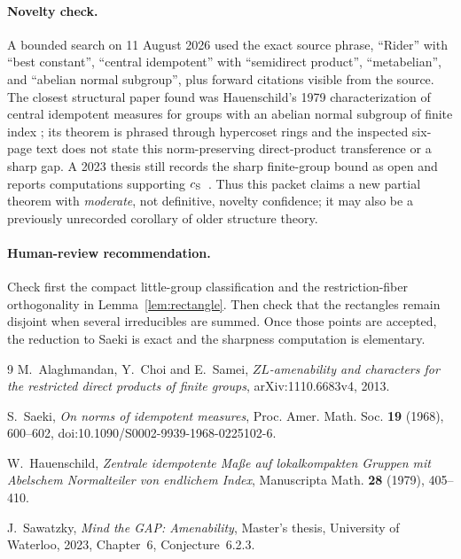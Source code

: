 \documentclass[11pt]{article}
\newcommand{\1}{\mathbf 1}
\begin{document}
\paragraph{Novelty check.}
A bounded search on 11 August 2026 used the exact source phrase, ``Rider'' with
``best constant'', ``central idempotent'' with ``semidirect product'', ``metabelian'',
and ``abelian normal subgroup'', plus forward citations visible from the source.
The closest structural paper found was Hauenschild's 1979 characterization of central
idempotent measures for groups with an abelian normal subgroup of finite index
\cite{Hauenschild}; its theorem is phrased through hypercoset rings and the inspected
six-page text does not state this norm-preserving direct-product transference or a sharp
gap.  A 2023 thesis still records the sharp finite-group bound as open and reports
computations supporting $c_{\rm S}$~\cite{Sawatzky}.  Thus this packet claims a new
partial theorem with \emph{moderate}, not definitive, novelty confidence; it may also
be a previously unrecorded corollary of older structure theory.

\paragraph{Human-review recommendation.}
Check first the compact little-group classification and the restriction-fiber
orthogonality in Lemma~\ref{lem:rectangle}.  Then check that the rectangles remain
disjoint when several irreducibles are summed.  Once those points are accepted, the
reduction to Saeki is exact and the sharpness computation is elementary.

\begin{thebibliography}{9}
M.~Alaghmandan, Y.~Choi and E.~Samei,
\emph{$ZL$-amenability and characters for the restricted direct products of finite groups},
arXiv:1110.6683v4, 2013.

S.~Saeki, \emph{On norms of idempotent measures},
Proc. Amer. Math. Soc. \textbf{19} (1968), 600--602,
doi:10.1090/S0002-9939-1968-0225102-6.

W.~Hauenschild, \emph{Zentrale idempotente Ma\ss e auf lokalkompakten Gruppen mit
Abelschem Normalteiler von endlichem Index}, Manuscripta Math. \textbf{28} (1979),
405--410.

J.~Sawatzky, \emph{Mind the GAP: Amenability}, Master's thesis,
University of Waterloo, 2023, Chapter~6, Conjecture~6.2.3.
\end{thebibliography}
\end{document}
